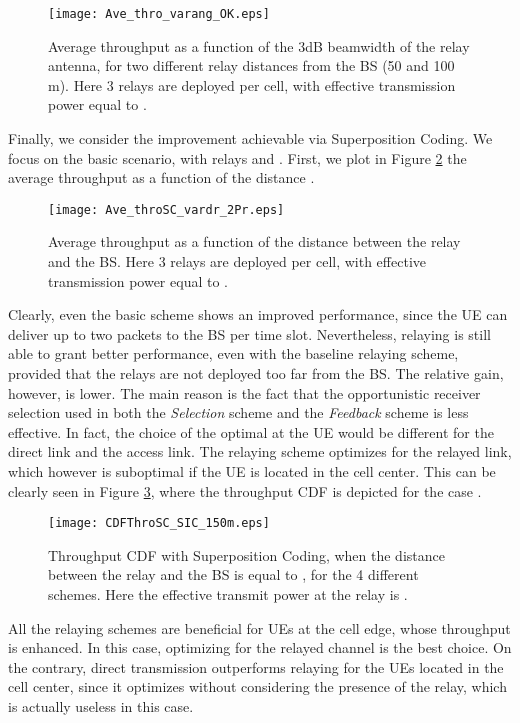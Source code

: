 \documentclass[12pt, letterpaper, onecolumn, draftcls]{IEEEtran}
\newcommand{\figw}{0.55\columnwidth}
\begin{document}
\begin{figure}
    \centering
     \texttt{[image: Ave\_thro\_varang\_OK.eps]}
     \caption{\small Average throughput as a function of the 3dB beamwidth of the relay antenna, for two different relay distances from the BS (50 and 100 m). Here 3 relays are deployed per cell, with effective transmission power equal to .}
\label{fig:Ave_thro_varang}
\end{figure}

Finally, we consider the improvement achievable via Superposition Coding. We focus on the basic scenario, with  relays and . First, we plot in Figure \ref{fig:Ave_throSC_vardr_2Pr} the average throughput as a function of the distance .
\begin{figure}
    \centering
     \texttt{[image: Ave\_throSC\_vardr\_2Pr.eps]}
     \vspace{-0.5cm}
     \caption{\small Average throughput as a function of the distance between the relay and the BS. Here 3 relays are deployed per cell, with effective transmission power equal to .}
\label{fig:Ave_throSC_vardr_2Pr}
\end{figure}
Clearly, even the basic scheme shows an improved performance, since the UE can deliver up to two packets to the BS per time slot. Nevertheless, relaying is still able to grant better performance, even with the baseline relaying scheme, provided that the relays are not deployed too far from the BS.
The relative gain, however, is lower. The main reason is the fact that the opportunistic receiver selection used in both the \textit{Selection} scheme and the \textit{Feedback} scheme is less effective. In fact, the choice of the optimal  at the UE would be different for the direct link and the access link. The relaying scheme optimizes  for the relayed link, which however is suboptimal if the UE is located in the cell center.
This can be clearly seen in Figure \ref{fig:CDFThroSC_SIC_150m}, where the throughput CDF is depicted for the case .
\begin{figure}
    \centering
    \texttt{[image: CDFThroSC\_SIC\_150m.eps]}
      \vspace{-0.5cm}
     \caption{\small Throughput CDF with Superposition Coding, when the distance  between the relay and the BS is equal to , for the 4 different schemes. Here the effective transmit power at the relay is .}
  \label{fig:CDFThroSC_SIC_150m}
  \vspace{-1cm}
\end{figure}
All the relaying schemes are beneficial for UEs at the cell edge, whose throughput is enhanced. In this case, optimizing  for the relayed channel is the best choice. On the contrary, direct transmission outperforms relaying for the UEs located in the cell center, since it optimizes  without considering the presence of the relay, which is actually useless in this case.
\end{document}
